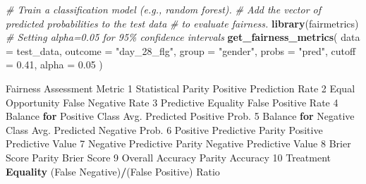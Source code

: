 \documentclass[10pt,a4paper,onecolumn]{article}
\newenvironment{Shaded}{\begin{snugshade}}{\end{snugshade}}
\newcommand{\AttributeTok}[1]{\textcolor[rgb]{0.13,0.29,0.53}{#1}}
\newcommand{\CommentTok}[1]{\textcolor[rgb]{0.56,0.35,0.01}{\textit{#1}}}
\newcommand{\ControlFlowTok}[1]{\textcolor[rgb]{0.13,0.29,0.53}{\textbf{#1}}}
\newcommand{\DecValTok}[1]{\textcolor[rgb]{0.00,0.00,0.81}{#1}}
\newcommand{\FloatTok}[1]{\textcolor[rgb]{0.00,0.00,0.81}{#1}}
\newcommand{\FunctionTok}[1]{\textcolor[rgb]{0.13,0.29,0.53}{\textbf{#1}}}
\newcommand{\NormalTok}[1]{#1}
\newcommand{\SpecialCharTok}[1]{\textcolor[rgb]{0.81,0.36,0.00}{\textbf{#1}}}
\newcommand{\StringTok}[1]{\textcolor[rgb]{0.31,0.60,0.02}{#1}}
\begin{document}
\begin{Shaded}
\begin{Highlighting}[]
\CommentTok{\# Train a classification model (e.g., random forest).}
\CommentTok{\# Add the vector of predicted probabilities to the test data}
\CommentTok{\# to evaluate fairness.}
\FunctionTok{library}\NormalTok{(fairmetrics)}
\CommentTok{\# Setting alpha=0.05 for 95\% confidence intervals}
\FunctionTok{get\_fairness\_metrics}\NormalTok{(}
 \AttributeTok{data =}\NormalTok{ test\_data,}
 \AttributeTok{outcome =} \StringTok{"day\_28\_flg"}\NormalTok{,}
 \AttributeTok{group =} \StringTok{"gender"}\NormalTok{,}
 \AttributeTok{probs =} \StringTok{"pred"}\NormalTok{,}
 \AttributeTok{cutoff =} \FloatTok{0.41}\NormalTok{, }
 \AttributeTok{alpha =} \FloatTok{0.05}
\NormalTok{)}

\NormalTok{           Fairness Assessment                                 Metric}
\DecValTok{1}\NormalTok{          Statistical Parity                Positive Prediction Rate}
\DecValTok{2}\NormalTok{           Equal Opportunity                     False Negative Rate}
\DecValTok{3}\NormalTok{         Predictive Equality                     False Positive Rate}
\DecValTok{4}\NormalTok{  Balance }\ControlFlowTok{for}\NormalTok{ Positive Class           Avg. Predicted Positive Prob.}
\DecValTok{5}\NormalTok{  Balance }\ControlFlowTok{for}\NormalTok{ Negative Class           Avg. Predicted Negative Prob.}
\DecValTok{6}\NormalTok{  Positive Predictive Parity               Positive Predictive Value}
\DecValTok{7}\NormalTok{  Negative Predictive Parity               Negative Predictive Value}
\DecValTok{8}\NormalTok{          Brier Score Parity                             Brier Score}
\DecValTok{9}\NormalTok{     Overall Accuracy Parity                                Accuracy}
\DecValTok{10}\NormalTok{         Treatment }\FunctionTok{Equality}\NormalTok{ (False Negative)}\SpecialCharTok{/}\NormalTok{(False Positive) Ratio}


\end{Highlighting}
\end{Shaded}
\end{document}
